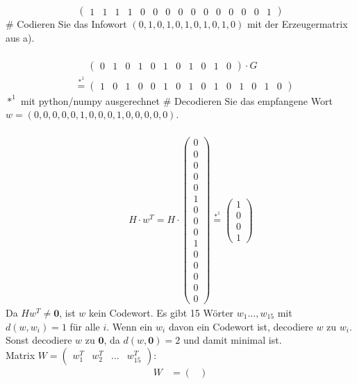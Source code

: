 \begin{myList}
$$\begin{pmatrix}
1&1&1&1&0&0&0&0&0&0&0&0&0&0&1
\end{pmatrix}$$
#
Codieren Sie das Infowort $(0,1,0,1,0,1,0,1,0,1,0)$ mit der Erzeugermatrix aus a).\\\\
\begin{align*}
&\phantom{\phantom{}=\phantom{}}\begin{pmatrix}0&1&0&1&0&1&0&1&0&1&0\end{pmatrix}\cdot G\\
&\overset{*^1}=\begin{pmatrix}1&0&1&0&0&1&0&1&0&1&0&1&0&1&0\end{pmatrix}
\end{align*}
{\small $*^1$ mit python/numpy ausgerechnet}
#
Decodieren Sie das empfangene Wort $w=(0,0,0,0,0,1,0,0,0,1,0,0,0,0,0)$.\\\\
\begin{align*}
&\phantom{\phantom{}=\phantom{}}H\cdot w^T = H\cdot \begin{pmatrix}0\\0\\0\\0\\0\\1\\0\\0\\0\\1\\0\\0\\0\\0\\0\end{pmatrix}\overset{*^1}=\begin{pmatrix}1\\0\\0\\1\end{pmatrix}
\end{align*}
Da $Hw^T\not=\mathbf 0$, ist $w$ kein Codewort. Es gibt 15 Wörter $w_1\ldots, w_{15}$ mit $d(w, w_i)=1$ für alle $i$. Wenn ein $w_i$ davon ein Codewort ist, decodiere $w$ zu $w_i$. Sonst decodiere $w$ zu $\mathbf 0$, da $d(w, \mathbf 0)=2$ und damit minimal ist.\\
Matrix $W=\begin{pmatrix}w_1^T&w_2^T&\ldots&w_{15}^T\end{pmatrix}$:
\begin{align*}
W&=\begin{pmatrix}

\end{pmatrix}
\end{align*}
\end{myList}
